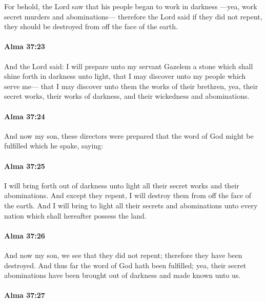 			For behold, the Lord saw that his people began to work in darkness
			---yea, work secret murders and abominations---
			therefore the Lord said
			if they did not repent,
			they should be destroyed from off the face of the earth.

		\paragraph{Alma 37:23} %
			\label{ALMA-37-23}

			And the Lord said:
			I will prepare unto my servant Gazelem
			a stone which shall shine forth in darkness unto light,
			that I may discover unto my people which serve me---
			that I may discover unto them the works of their brethren,
			yea, their secret works, their works of darkness,
			and their wickedness and abominations.

		\paragraph{Alma 37:24} %
			\label{ALMA-37-24}

			And now my son, these directors were prepared
			that the word of God might be fulfilled which he spake, saying:

		\paragraph{Alma 37:25} %
			\label{ALMA-37-25}

			I will bring forth out of darkness unto light
			all their secret works and their abominations.
			And except they repent, I will destroy them from off the face of the earth.
			And I will bring to light all their secrets and abominations
			unto every nation which shall hereafter possess the land.

		\paragraph{Alma 37:26} %
			\label{ALMA-37-26}

			And now my son, we see that they did not repent;
			therefore they have been destroyed.
			And thus far the word of God hath been fulfilled;
			yea, their secret abominations have been brought out of darkness
			and made known unto us.

		\paragraph{Alma 37:27} %
			\label{ALMA-37-27}

